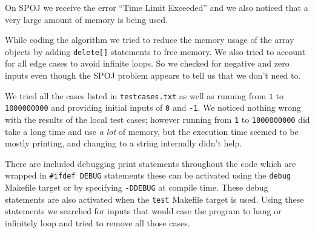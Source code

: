 \documentclass[11pt, letterpaper]{article}
\newcommand{\code}[1]{\texttt{#1}}
\begin{document}


\noindent{\today}


\bigskip
{}

On SPOJ we receive the error ``Time Limit Exceeded'' and we also noticed that a very large amount of memory is being used.

\bigskip
{}

While coding the algorithm we tried to reduce the memory usage of the array objects by adding \code{delete[]} statements to free memory. We also tried to account for all edge cases to avoid infinite loops. So we checked for negative and zero inputs even though the SPOJ problem appears to tell us that we don't need to.

\bigskip
{}

We tried all the cases listed in \code{testcases.txt} as well as running from \code{1} to \code{1000000000} and providing initial inputs of \code{0} and \code{-1}. We noticed nothing wrong with the results of the local test cases; however running from \code{1} to \code{1000000000} did take a long time and use \textit{a lot} of memory, but the execution time seemed to be mostly printing, and changing to a string internally didn't help.

\bigskip
{}

There are included debugging print statements throughout the code which are wrapped in \code{\#ifdef DEBUG} statements these can be activated using the \code{debug} Makefile target or by specifying \code{-DDEBUG} at compile time. These debug statements are also activated when the \code{test} Makefile target is used. Using these statements we searched for inputs that would case the program to hang or infinitely loop and tried to remove all those cases.
\end{document}
